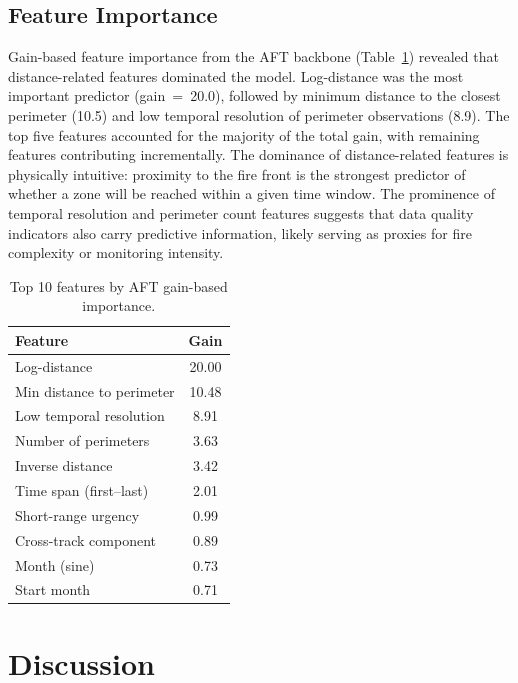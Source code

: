 \documentclass[fire,article,submit,pdftex]{../Definitions/mdpi}
\begin{document}
\subsection{Feature Importance}\label{sec:feature_importance}

Gain-based feature importance from the AFT backbone (Table~\ref{tab:feature_importance}) revealed that distance-related features dominated the model.
Log-distance was the most important predictor (gain~=~20.0), followed by minimum distance to the closest perimeter (10.5) and low temporal resolution of perimeter observations (8.9).
The top five features accounted for the majority of the total gain, with remaining features contributing incrementally.
The dominance of distance-related features is physically intuitive: proximity to the fire front is the strongest predictor of whether a zone will be reached within a given time window.
The prominence of temporal resolution and perimeter count features suggests that data quality indicators also carry predictive information, likely serving as proxies for fire complexity or monitoring intensity.

\begin{table}[!ht]
\caption{Top 10 features by AFT gain-based importance.}\label{tab:feature_importance}
\begin{tabular}{lc}
\toprule
\textbf{Feature} & \textbf{Gain} \\
\midrule
Log-distance              & 20.00 \\
Min distance to perimeter & 10.48 \\
Low temporal resolution   &  8.91 \\
Number of perimeters      &  3.63 \\
Inverse distance          &  3.42 \\
Time span (first--last)   &  2.01 \\
Short-range urgency       &  0.99 \\
Cross-track component     &  0.89 \\
Month (sine)              &  0.73 \\
Start month               &  0.71 \\
\bottomrule
\end{tabular}
\end{table}

\section{Discussion}\label{sec:discussion}
\end{document}
